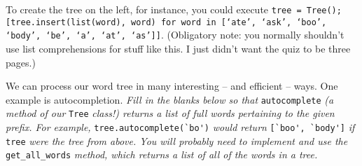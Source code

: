 \medskip

To create the tree on the left, for instance, you could execute {\tt tree = Tree(); [tree.insert(list(word), word) for word in [`ate', `ask', `boo', `body', `be', `a', `at', `as']]}. (Obligatory note: you normally shouldn't use list comprehensions for stuff like this. I just didn't want the quiz to be three pages.)

We can process our word tree in many interesting -- and efficient -- ways. One example is autocompletion. \textit{Fill in the blanks below so that} \lstinline/autocomplete/ \textit{(a method of our} \lstinline/Tree/ \textit{class!) returns a list of full words pertaining to the given prefix. For example,} \lstinline/tree.autocomplete(`bo')/ \textit{would return} \lstinline/[`boo', `body']/ \textit{if} \lstinline/tree/ \textit{were the tree from above. You will probably need to implement and use the} \lstinline/get_all_words/ \textit{method, which returns a list of all of the words in a tree.}


